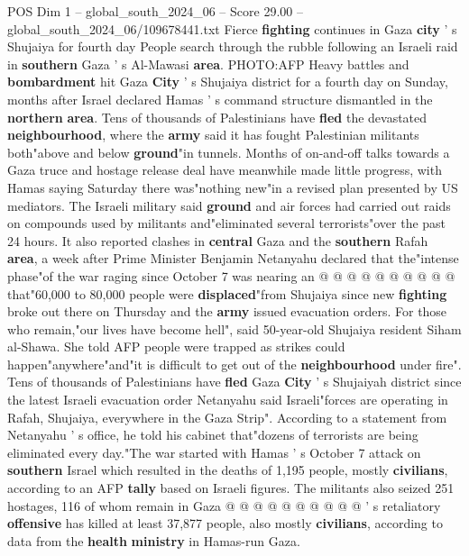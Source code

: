 \begin{textsample}{POS Dim 1 – global\_south\_2024\_06 – Score 29.00 – global\_south\_2024\_06/109678441.txt}  \label{ex:f1_pos_050}
Fierce \textbf{fighting} continues in Gaza \textbf{city} ' s Shujaiya for fourth day People search through the rubble following an Israeli raid in \textbf{southern} Gaza ' s Al-Mawasi \textbf{area}.
PHOTO:AFP Heavy battles and \textbf{bombardment} hit Gaza \textbf{City} ' s Shujaiya district for a fourth day on Sunday, months after Israel declared Hamas ' s command structure dismantled in the \textbf{northern} \textbf{area}.
Tens of thousands of Palestinians have \textbf{fled} the devastated \textbf{neighbourhood}, where the \textbf{army} said it has fought Palestinian militants both"above and below \textbf{ground}"in tunnels.
Months of on-and-off talks towards a Gaza truce and hostage release deal have meanwhile made little progress, with Hamas saying Saturday there was"nothing new"in a revised plan presented by US mediators.
The Israeli military said \textbf{ground} and air forces had carried out raids on compounds used by militants and"eliminated several terrorists"over the past 24 hours.
It also reported clashes in \textbf{central} Gaza and the \textbf{southern} Rafah \textbf{area}, a week after Prime Minister Benjamin Netanyahu declared that the"intense phase"of the war raging since October 7 was nearing an @ @ @ @ @ @ @ @ @ @ that"60,000 to 80,000 people were \textbf{displaced}"from Shujaiya since new \textbf{fighting} broke out there on Thursday and the \textbf{army} issued evacuation orders.
For those who remain,"our lives have become hell", said 50-year-old Shujaiya resident Siham al-Shawa.
She told AFP people were trapped as strikes could happen"anywhere"and"it is difficult to get out of the \textbf{neighbourhood} under fire".
Tens of thousands of Palestinians have \textbf{fled} Gaza \textbf{City} ' s Shujaiyah district since the latest Israeli evacuation order Netanyahu said Israeli"forces are operating in Rafah, Shujaiya, everywhere in the Gaza Strip".
According to a statement from Netanyahu ' s office, he told his cabinet that"dozens of terrorists are being eliminated every day."The war started with Hamas ' s October 7 attack on \textbf{southern} Israel which resulted in the deaths of 1,195 people, mostly \textbf{civilians}, according to an AFP \textbf{tally} based on Israeli figures.
The militants also seized 251 hostages, 116 of whom remain in Gaza @ @ @ @ @ @ @ @ @ @ ' s retaliatory \textbf{offensive} has killed at least 37,877 people, also mostly \textbf{civilians}, according to data from the \textbf{health} \textbf{ministry} in Hamas-run Gaza.

\end{textsample}
